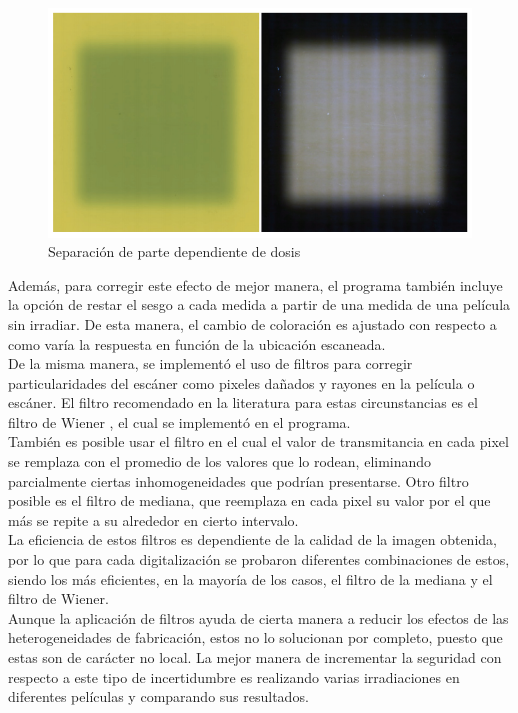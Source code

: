\begin{figure}
	\centering
	\includegraphics[width=0.7\linewidth]{images/imagenMicke.png}
	
	\caption{Separación de parte dependiente de dosis\cite{Micke2011}}
	\label{fig:Multicanal}
\end{figure}

Además, para corregir este efecto de mejor manera, el programa también incluye la opción de restar el sesgo a cada medida a partir de una medida de una película sin irradiar. De esta manera, el cambio de coloración es ajustado con respecto a como varía la respuesta en función de la ubicación escaneada. \\

De la misma manera, se implementó el uso de filtros para corregir particularidades del escáner como pixeles dañados y rayones en la película o escáner. El filtro recomendado en la literatura para estas circunstancias es el filtro de Wiener \cite{Devic2016}, el cual se implementó en el programa. \\

También es posible usar el filtro en el cual el valor de transmitancia en cada pixel se remplaza con el promedio de los valores que lo rodean, eliminando parcialmente ciertas inhomogeneidades que podrían presentarse. Otro filtro posible es el filtro de mediana, que reemplaza en cada pixel su valor por el que más se repite a su alrededor en cierto intervalo. \\

La eficiencia de estos filtros es dependiente de la calidad de la imagen obtenida, por lo que para cada digitalización se probaron diferentes combinaciones de estos, siendo los más eficientes, en la mayoría de los casos, el filtro de la mediana y el filtro de Wiener.\\

Aunque la aplicación de filtros ayuda de cierta manera a reducir los efectos de las heterogeneidades de fabricación, estos no lo solucionan por completo, puesto que estas son de carácter no local. La mejor manera de incrementar la seguridad con respecto a este tipo de incertidumbre es realizando varias irradiaciones en  diferentes películas y comparando sus resultados.\\


